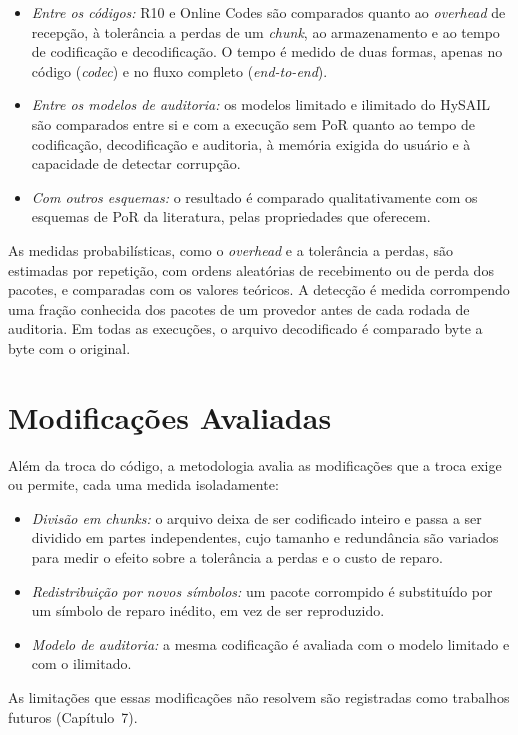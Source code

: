 \begin{itemize}
	\item \textit{Entre os códigos:} R10 e Online Codes são comparados quanto ao \emph{overhead} de recepção, à tolerância a perdas de um \emph{chunk}, ao armazenamento e ao tempo de codificação e decodificação. O tempo é medido de duas formas, apenas no código (\emph{codec}) e no fluxo completo (\emph{end-to-end}).
	\item \textit{Entre os modelos de auditoria:} os modelos limitado e ilimitado do HySAIL são comparados entre si e com a execução sem \acrshort{PoR} quanto ao tempo de codificação, decodificação e auditoria, à memória exigida do usuário e à capacidade de detectar corrupção.
	\item \textit{Com outros esquemas:} o resultado é comparado qualitativamente com os esquemas de \acrshort{PoR} da literatura, pelas propriedades que oferecem.
\end{itemize}

As medidas probabilísticas, como o \emph{overhead} e a tolerância a perdas, são estimadas por repetição, com ordens aleatórias de recebimento ou de perda dos pacotes, e comparadas com os valores teóricos. A detecção é medida corrompendo uma fração conhecida dos pacotes de um provedor antes de cada rodada de auditoria. Em todas as execuções, o arquivo decodificado é comparado byte a byte com o original.

\section{Modificações Avaliadas}

Além da troca do código, a metodologia avalia as modificações que a troca exige ou permite, cada uma medida isoladamente:

\begin{itemize}
	\item \textit{Divisão em chunks:} o arquivo deixa de ser codificado inteiro e passa a ser dividido em partes independentes, cujo tamanho e redundância são variados para medir o efeito sobre a tolerância a perdas e o custo de reparo.
	\item \textit{Redistribuição por novos símbolos:} um pacote corrompido é substituído por um símbolo de reparo inédito, em vez de ser reproduzido.
	\item \textit{Modelo de auditoria:} a mesma codificação é avaliada com o modelo limitado e com o ilimitado.
\end{itemize}

As limitações que essas modificações não resolvem são registradas como trabalhos futuros (Capítulo~7).
